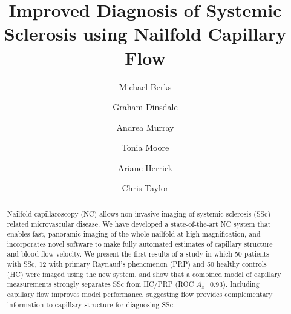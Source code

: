 \documentclass[runningheads,a4paper]{llncs}
\begin{document}
\mainmatter  %

\title{Improved Diagnosis of Systemic Sclerosis using Nailfold Capillary Flow}


%
%
\author{Michael Berks \and Graham Dinsdale \and Andrea Murray \and Tonia Moore \and Ariane Herrick \and Chris Taylor}


\maketitle


\begin{abstract}
Nailfold capillaroscopy (NC) allows non-invasive imaging of systemic sclerosis (SSc) related microvascular disease. We have developed a state-of-the-art NC system that enables fast, panoramic imaging of the whole nailfold at high-magnification, and incorporates novel software to make fully automated estimates of capillary structure and blood flow velocity. We present the first results of a study in which 50 patients with SSc, 12 with primary Raynaud’s phenomenon (PRP) and 50 healthy controls (HC) were imaged using the new system, and show that a combined model of capillary measurements strongly separates SSc from HC/PRP (ROC $A_z$=0.93). Including capillary flow improves model performance, suggesting flow provides complementary information to capillary structure for diagnosing SSc.
\end{abstract}
\end{document}
